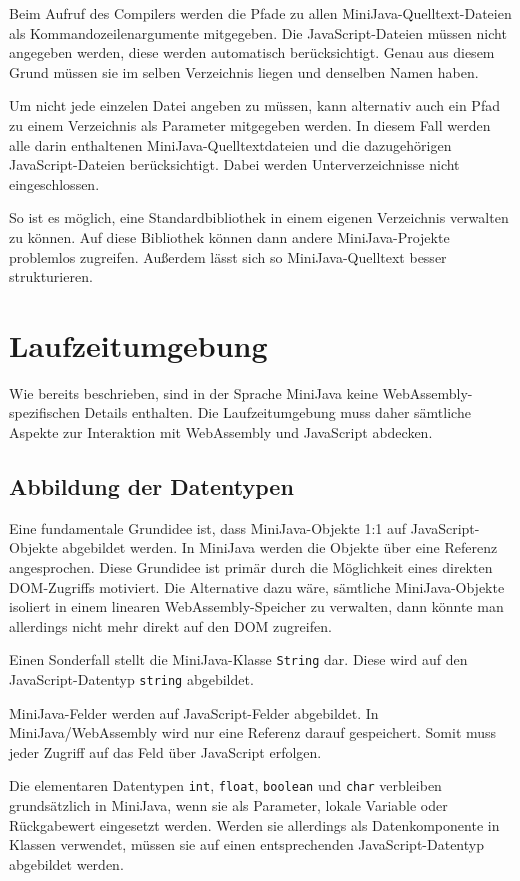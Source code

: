 Beim Aufruf des Compilers werden die Pfade zu allen MiniJava-Quelltext-Dateien als Kommandozeilenargumente mitgegeben. Die JavaScript-Dateien müssen nicht angegeben werden, diese werden automatisch berücksichtigt. Genau aus diesem Grund müssen sie im selben Verzeichnis liegen und denselben Namen haben.

Um nicht jede einzelen Datei angeben zu müssen, kann alternativ auch ein Pfad zu einem Verzeichnis als Parameter mitgegeben werden. In diesem Fall werden alle darin enthaltenen MiniJava-Quelltextdateien und die dazugehörigen JavaScript-Dateien berücksichtigt. Dabei werden Unterverzeichnisse nicht eingeschlossen.

So ist es möglich, eine Standardbibliothek in einem eigenen Verzeichnis verwalten zu können. Auf diese Bibliothek können dann andere MiniJava-Projekte problemlos zugreifen. Außerdem lässt sich so MiniJava-Quelltext besser strukturieren.

\section{Laufzeitumgebung}

Wie bereits beschrieben, sind in der Sprache MiniJava keine WebAssembly-spezifischen Details enthalten. Die Laufzeitumgebung muss daher sämtliche Aspekte zur Interaktion mit WebAssembly und JavaScript abdecken.

\subsection{Abbildung der Datentypen}
Eine fundamentale Grundidee ist, dass MiniJava-Objekte 1:1 auf JavaScript-Objekte abgebildet werden. In MiniJava werden die Objekte über eine Referenz angesprochen. Diese Grundidee ist primär durch die Möglichkeit eines direkten DOM-Zugriffs motiviert. Die Alternative dazu wäre, sämtliche MiniJava-Objekte isoliert in einem linearen WebAssembly-Speicher zu verwalten, dann könnte man allerdings nicht mehr direkt auf den DOM zugreifen.

Einen Sonderfall stellt die MiniJava-Klasse \lstinline{String} dar. Diese wird auf den JavaScript-Datentyp \lstinline{string} abgebildet.

MiniJava-Felder werden auf JavaScript-Felder abgebildet. In MiniJava/WebAssembly wird nur eine Referenz darauf gespeichert. Somit muss jeder Zugriff auf das Feld über JavaScript erfolgen.

Die elementaren Datentypen \lstinline{int}, \lstinline{float}, \lstinline{boolean} und \lstinline{char} verbleiben grundsätzlich in MiniJava, wenn sie als Parameter, lokale Variable oder Rückgabewert eingesetzt werden. Werden sie allerdings als Datenkomponente in Klassen verwendet, müssen sie auf einen entsprechenden JavaScript-Datentyp abgebildet werden.

